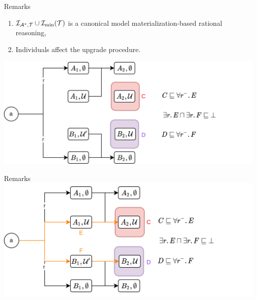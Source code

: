 \documentclass[10pt]{beamer}
\newcommand{\fullminmod}{\ensuremath{\Imc_{\Amc^{*}, \Tmc}} \cup \Imc_{\min}(\Tmc)}
\begin{document}
\begin{frame}{Remarks}
\begin{enumerate}
  \item $\fullminmod$ is a canonical model \wrt materialization-based rational reasoning, \pause
  \item Individuals affect the upgrade procedure.
\end{enumerate}

\pause
\includegraphics[scale=0.35]{img/indblockcon1.png}

\end{frame}

\begin{frame}{Remarks}
  \includegraphics[scale=0.37]{img/indblockcon2.png}
\end{frame}
\end{document}
